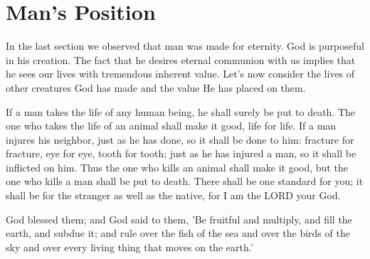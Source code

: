 \vspace{2\baselineskip}

\newpage
\section{Man's Position}
\begin{fullwidth}
In the last section we observed that man was made for eternity. God is purposeful in his creation.
The fact that he desires eternal communion with us implies that he sees our lives with tremendous inherent value. Let's now consider the lives 
of other creatures God has made and the value He has placed on them.
\end{fullwidth}

\vspace{2\baselineskip}

\begin{scripture}[Leviticus 24:17-22]
     If a man takes the life of any human being, he shall surely be put to death.
        The one who takes the life of an animal shall make it good, life for life.
        If a man injures his neighbor, just as he has done, so it shall be done to him:
        fracture for fracture, eye for eye, tooth for tooth; just as he has injured a man, so it shall be inflicted on him.
        Thus the one who kills an animal shall make it good, but the one who kills a man shall be put to death.
        There shall be one standard for you; it shall be for the stranger as well as the native, for I am the LORD your God.
\end{scripture}

\vspace{3\baselineskip}

\begin{scripture}[Gen 1:28]
    God blessed them; and God said to them, 'Be fruitful and multiply, and fill the earth, and subdue it; and rule over the fish of the sea and over the birds of the sky and over every living thing that moves on the earth.'
\end{scripture}

\vspace{8\baselineskip}

